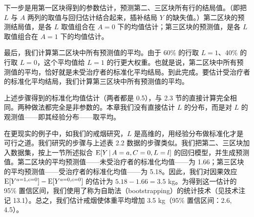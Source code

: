 下一步是用第一区块得到的参数估计，预测第二、三区块所有行的结局值。（即把 $L$ 与 $A$ 两列的取值与回归估计结合起来，插补结局 $Y$ 的缺失值。）第二区块的预测结局值，是各 $L$ 取值组合在 $A=0$ 下的均值估计；第三区块的预测值，是各 $L$ 取值组合在 $A=1$ 下的均值估计。

最后，我们计算第二区块中所有预测值的平均。由于 60\% 的行取 $L=1$、40\% 的行取 $L=0$，这个平均值给 $L=1$ 的行更大权重。也就是说，第二区块中所有预测值的平均，恰好就是未受治疗者的标准化平均结局。到此完成。要估计受治疗者的标准化平均结局，我们计算第三区块中所有预测值的平均。

上述步骤得到的标准化均值估计（两者都是 0.5），与 2.3 节的直接计算完全相同。两种做法都完全是非参数的。本章我们没有直接估计 $L$ 的分布，而是对 $L$ 的观测值——即其经验分布——取平均。

在更现实的例子中，如我们的戒烟研究，$L$ 是高维的，用经验分布做标准化才是可行之道。我们研究的步骤与上述表 2.2 数据的步骤类似。我们把第二、三区块加入数据集，按上一节所述拟合 $\mathrm{E}[Y\,|\, A=a,C=0,L=l]$ 的回归模型，并生成预测值。第二区块的平均预测值——未受治疗者的标准化均值——为 1.66；第三区块的平均预测值——受治疗者的标准化均值——为 5.18。因此，我们对因果效应 $\mathrm{E}[Y^{a=1,c=0}]-\mathrm{E}[Y^{a=0,c=0}]$ 的估计为 $5.18-1.66=3.5$ kg。为得到这一估计的 95\% 置信区间，我们使用了称为自助法（bootstrapping）的统计技术（见技术注记 13.1）。总之，我们估计戒烟使体重平均增加 3.5 kg（95\% 置信区间：2.6, 4.5）。

